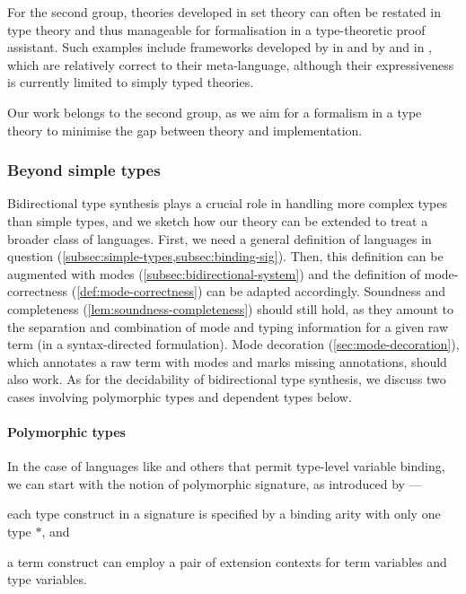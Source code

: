 For the second group, theories developed in set theory can often be restated in type theory and thus manageable for formalisation in a type-theoretic proof assistant. 
Such examples include frameworks developed by \citet{Ahrens2022} in \Coq and by \citet{Allais2021} and \citet{Fiore2022} in \Agda, which are relatively correct to their meta-language, although their expressiveness is currently limited to simply typed theories.

Our work belongs to the second group, as we aim for a formalism in a type theory to minimise the gap between theory and implementation.

\subsubsection{Beyond simple types}

Bidirectional type synthesis plays a crucial role in handling more complex types than simple types, and we sketch how our theory can be extended to treat a broader class of languages.
First, we need a general definition of languages in question (\cref{subsec:simple-types,subsec:binding-sig}).
Then, this definition can be augmented with modes (\cref{subsec:bidirectional-system}) and the definition of mode-correctness (\cref{def:mode-correctness}) can be adapted accordingly.
Soundness and completeness (\cref{lem:soundness-completeness}) should still hold, as they amount to the separation and combination of mode and typing information for a given raw term (in a syntax-directed formulation).
Mode decoration (\cref{sec:mode-decoration}), which annotates a raw term with modes and marks missing annotations, should also work.
As for the decidability of bidirectional type synthesis, we discuss two cases involving polymorphic types and dependent types below.

\paragraph{Polymorphic types}
In the case of languages like \SystemF and others that permit type-level variable binding, we can start with the notion of polymorphic signature, as introduced by \citet{Hamana2011}---\begin{inlineenum}
  \item each type construct in a signature is specified by a binding arity with only one type $*$, and
  \item a term construct can employ a pair of extension contexts for term variables and type variables.
\end{inlineenum}


